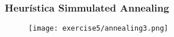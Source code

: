 \subsubsection{Heurística Simmulated Annealing}


\begin{figure}[H]
	\centering
	\texttt{[image: exercise5/annealing3.png]}
\end{figure}